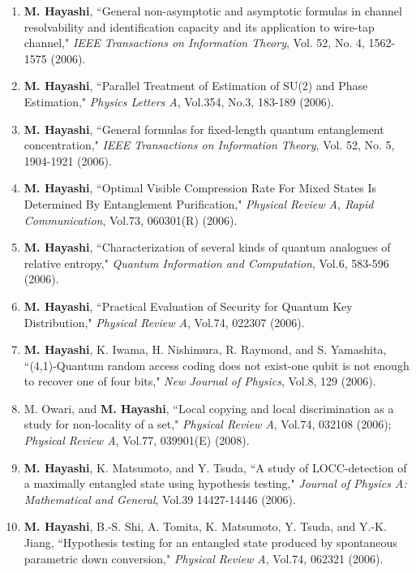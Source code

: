 \documentclass[a4paper,12pt,oneside]{article}
\begin{document}
\begin{enumerate}
\item
\textbf{M. Hayashi}, ``General non-asymptotic and asymptotic formulas in channel resolvability and identification capacity and its application to wire-tap channel," 
{\em IEEE Transactions on Information Theory}, Vol. 52, No. 4, 1562-1575 (2006).

\item
\textbf{M. Hayashi}, ``Parallel Treatment of Estimation of SU(2) and Phase Estimation," 
{\em Physics Letters A}, Vol.354, No.3, 183-189 (2006).

\item
\textbf{M. Hayashi}, ``General formulas for fixed-length quantum entanglement concentration," 
{\em IEEE Transactions on Information Theory}, Vol. 52, No. 5, 1904-1921 (2006).

\item
\textbf{M. Hayashi}, ``Optimal Visible Compression Rate For Mixed States Is Determined By Entanglement Purification," 
{\em Physical Review A, Rapid Communication}, Vol.73, 060301(R) (2006). 

\item
\textbf{M. Hayashi}, ``Characterization of several kinds of quantum analogues of relative entropy," 
{\em Quantum Information and Computation}, Vol.6, 583-596 (2006).

\item
\textbf{M. Hayashi}, ``Practical Evaluation of Security for Quantum Key Distribution," 
{\em Physical Review A}, Vol.74, 022307 (2006).

\item
\textbf{M. Hayashi}, K. Iwama, H. Nishimura, R. Raymond, and S. Yamashita, 
``(4,1)-Quantum random access coding does not exist-one qubit is not enough to recover one of four bits," 
{\em New Journal of Physics}, Vol.8, 129 (2006).

\item
M. Owari, and \textbf{M. Hayashi}, 
``Local copying and local discrimination as a study for non-locality of a set," 
{\em Physical Review A}, Vol.74, 032108 (2006); 
{\em Physical Review A}, Vol.77, 039901(E) (2008).

\item
\textbf{M. Hayashi}, K. Matsumoto, and Y. Tsuda, 
``A study of LOCC-detection of a maximally entangled state using hypothesis testing," 
{\em Journal of Physics A: Mathematical and General}, Vol.39 14427-14446 (2006).

\item
\textbf{M. Hayashi}, B.-S. Shi, A. Tomita, K. Matsumoto, Y. Tsuda, and Y.-K. Jiang, 
``Hypothesis testing for an entangled state produced by spontaneous parametric down conversion," 
{\em Physical Review A}, Vol.74, 062321 (2006).


\end{enumerate}
\end{document}
